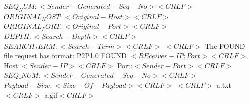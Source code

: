 \documentclass[12pt,letterpaper,boxed]{hmcpset}
\begin{document}
$SEQ_NUM:<Sender-Generated-Seq-No><CRLF>$\newline
$ORIGINAL_HOST:<Original-Host><CRLF>$\newline
$ORIGINAL_PORT:<Original-Port><CRLF>$\newline
$DEPTH:<Search-Depth><CRLF>$\newline
$SEARCH_TERM:<Search-Term><CRLF>$\newline
$<CRLF>$\newline
The FOUND file request has format:\newline
P2P1.0 FOUND $<REceiver-IP:Port><CRLF>$ \newline
Host:$<Sender-IP><CRLF>$\newline
Port:$<Sender-Port><CRLF>$\newline
$SEQ\_NUM:<Sender-Generated-Seq-No><CRLF>$\newline
$Payload-Size:<Size-Of-Payload><CRLF>$\newline
$<CRLF>$\newline
a.txt$<CRLF>$\newline
a.gif$<CRLF>$\newline
\end{document}
